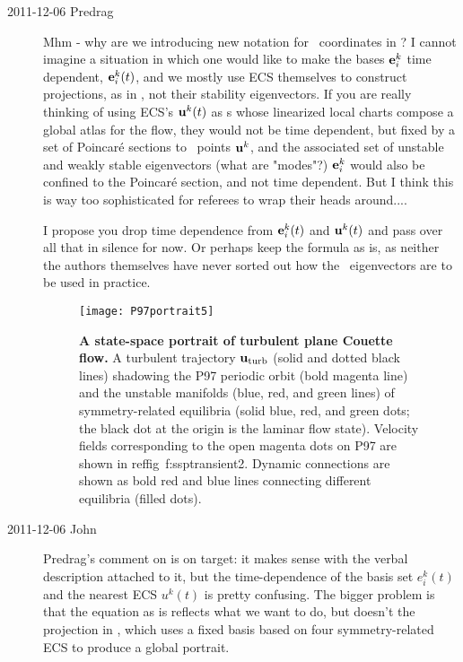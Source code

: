 \begin{description}
\item[2011-12-06 Predrag]
Mhm - why are we introducing new notation for \statesp\
coordinates in ? I cannot imagine a situation in which one
would like to make the bases  ${\bf e}^k_i$ time dependent, ${\bf e}^k_i(t)$,
and we mostly use ECS themselves to construct projections, as in
\reffig{f:ssptransient}, not their stability eigenvectors. If you are really
thinking of using ECS's ${\bf u}^k(t)$ as \template s whose linearized local
charts compose a global atlas for the flow, they would not be time dependent,
but fixed by a set of Poincar\'e sections to \statesp\ points ${\bf u}^k$, and
the associated set of unstable and weakly stable eigenvectors (what are
"modes"?) ${\bf e}_i^k$ would also be confined to the Poincar\'e section, and
not time dependent. But I think this is way too sophisticated for referees to
wrap their heads around....

I propose you drop time dependence from ${\bf e}^k_i(t)$ and ${\bf
u}^k(t)$ and pass over all that in silence for now. Or perhaps keep the
formula as is, as neither the authors themselves have never sorted out
how the \po\ eigenvectors are to be used in practice.

\begin{figure}
\texttt{[image: P97portrait5]}
\caption{
{\bf A state-space portrait of turbulent plane Couette flow.}
A turbulent trajectory ${\bf u}_{\text{turb}}$ (solid and dotted black
lines) shadowing the P97 periodic orbit (bold magenta line) and the
unstable manifolds (blue, red, and green lines) of symmetry-related
equilibria (solid blue, red, and green dots; the black dot at the origin
is the laminar flow state). Velocity fields corresponding to the open
magenta dots on P97 are shown in  reffig~{f:ssptransient2}. Dynamic
connections are shown as bold red and blue lines connecting different
equilibria (filled dots).
}
\label{f:ssptransient}
\end{figure}

\item[2011-12-06 John] Predrag's comment on  is on
target: it makes sense with the verbal description attached to it, but
the time-dependence of the basis set $e_i^k(t)$ and the nearest ECS
$u^k(t)$ is pretty confusing. The bigger problem is that the equation as
is reflects what we want to do, but doesn't the projection in
, which uses a fixed basis based on four
symmetry-related ECS to produce a global portrait.



\end{description}
